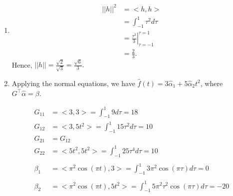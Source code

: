 \documentclass[letterpaper]{article}
\begin{document}
\begin{enumerate}
\setlength{\itemsep}{.15in}
\renewcommand{\labelenumi}{(\alph{enumi})}
\item \begin{align*}
||h||^2 &= <h,h> \\
&= \int_{-1}^{1} \tau^2 d \tau \\
&= \left. \frac{\tau^3}{3}  \right|_{\tau=-1}^{\tau=1} \\
&= \frac{2}{3}.
\end{align*}
Hence, $\boxed{||h|| = \frac{\sqrt{2}}{\sqrt{3}} = \frac{\sqrt{6}}{3} .}$

\item Applying the normal equations, we have $\hat{f}(t) = 3 \hat{\alpha}_1 + 5 \hat{\alpha}_2 t^2$, where $ G^\top \hat{\alpha} = \beta$.

\begin{align*}
G_{11} &= <3, 3> = \int_{-1}^{1} 9 d \tau = 18\\
G_{12}&= <3, 5t^2> =  \int_{-1}^{1} 15 \tau^2 d \tau = 10\\
G_{21}&=G_{12}\\
G_{22} &= <5t^2, 5t^2> = \int_{-1}^{1} 25 \tau^4 d \tau = 10\\
\\
\beta_1 &= <\pi^2 \cos(\pi t), 3> = \int_{-1}^{1} 3 \pi^2 \cos(\pi \tau)d \tau = 0\\
\\
\beta_2 &= <\pi^2 \cos(\pi t), 5t^2> = \int_{-1}^{1} 5 \pi^2 \tau^2 \cos(\pi \tau) d \tau = -20
\end{align*}


\end{enumerate}
\end{document}
